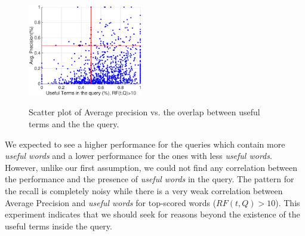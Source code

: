 \begin{figure}[t!]
\begin{centering}
{\includegraphics[width=5cm]{figs/greaterthan10-p.eps}}
\par\end{centering}

\protect\caption{Scatter plot of Average precision vs. the overlap between useful terms and the the query.}
\label{fig:overlap-p}
\end{figure}
We expected to see a higher performance for the queries which contain more \textit{useful words} and a lower performance for the ones with less \textit{useful words}. However, unlike our first assumption, we could not find any correlation between the performance and the presence of \textit{useful words} in the query. The pattern for the recall is completely noisy while there is a very weak correlation between Average Precision and \textit{useful words} for top-scored words ($RF(t, Q)>10$). This experiment indicates that we should seek for reasons beyond the existence of the useful terms inside the query.  

